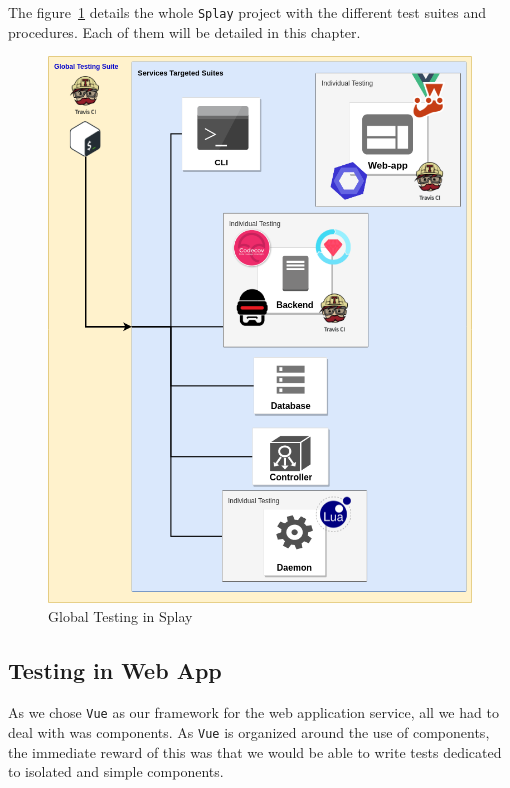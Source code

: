 \documentclass{eplmastersthesis}
\begin{document}
      The figure~\ref{global_testing} details the whole \texttt{Splay} project with the different
      test suites and procedures. Each of them will be detailed in this chapter.

      \begin{figure}[H]
        \centering
        \includegraphics[scale=0.55]{figures/global_testing.png}
        \caption{\label{global_testing} Global Testing in Splay}
      \end{figure}

      \subsection{Testing in Web App}

        As we chose \texttt{Vue} as our framework for the web application service,
        all we had to deal with was components. As \texttt{Vue} is organized around
        the use of components, the immediate reward of this was that we would
        be able to write tests dedicated to isolated and simple components.
\end{document}
